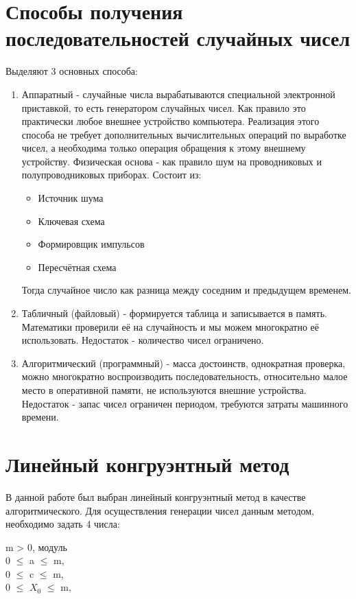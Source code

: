 \documentclass[12pt,a4paper,oneside]{report}
\begin{document}
\section*{Способы получения последовательностей случайных чисел}
\quad Выделяют 3 основных способа:
\begin{enumerate}
    \item Аппаратный - случайные числа вырабатываются специальной электронной приставкой, то есть генератором случайных чисел. Как правило это практически любое внешнее устройство компьютера. Реализация этого способа не требует дополнительных вычислительных операций по выработке чисел, а необходима только операция обращения к этому внешнему устройству. Физическая основа - как правило шум на проводниковых и полупроводниковых приборах. Состоит из:
    \begin{itemize}
        \item Источник шума
        \item Ключевая схема
        \item Формировщик импульсов
        \item Пересчётная схема
    \end{itemize}
    Тогда случайное число как разница между соседним и предыдущем временем.

    \item Табличный (файловый) - формируется таблица и записывается в память. Математики проверили её на случайность и мы можем многократно её использовать. Недостаток - количество чисел ограничено.

    \item Алгоритмический (программный) - масса достоинств, однократная проверка, можно многократно воспроизводить последовательность, относительно малое место в оперативной памяти, не используются внешние устройства. Недостаток - запас чисел ограничен периодом, требуются затраты машинного времени.
\end{enumerate}

\section*{Линейный конгруэнтный метод}
\quad В данной работе был выбран линейный конгруэнтный метод в качестве алгоритмического.
Для осуществления генерации чисел данным методом, необходимо задать 4 числа:

\begin{center}
m > 0, модуль\\
0 $\leq$ a	$\leq$ m, \\
0 $\leq$ c $\leq$ m, \\
0 $\leq$ $X_0$ $\leq$ m, \\
\end{center}
\end{document}

